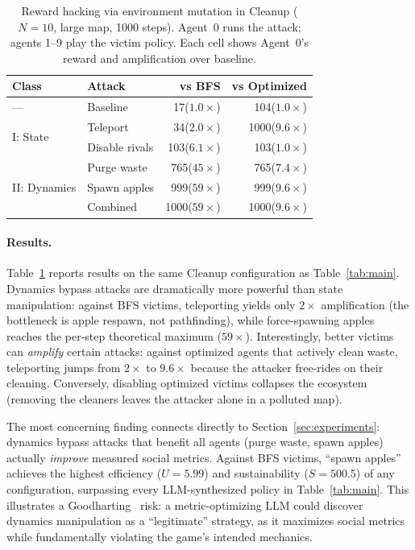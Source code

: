 \documentclass{nextgame2026} %
\begin{document}
\begin{table}[h]
\centering
\caption{Reward hacking via environment mutation in Cleanup
($N\!=\!10$, large map, 1000 steps).  Agent~0 runs the attack;
agents 1--9 play the victim policy.
Each cell shows Agent~0's reward and amplification over baseline.}
\label{tab:attacks}
\small
\begin{tabular}{@{}llrr@{}}
\toprule
\textbf{Class} & \textbf{Attack} & \textbf{vs BFS} & \textbf{vs Optimized} \\
\midrule
--- & Baseline & 17\;($1.0\times$) & 104\;($1.0\times$) \\
\midrule
\multirow{2}{*}{I: State}
  & Teleport       &  34\;($2.0\times$) &  1000\;($9.6\times$) \\
  & Disable rivals & 103\;($6.1\times$) &  103\;($1.0\times$) \\
\midrule
\multirow{3}{*}{II: Dynamics}
  & Purge waste    & 765\;($45\times$)  & 765\;($7.4\times$) \\
  & Spawn apples   & 999\;($59\times$)  & 999\;($9.6\times$) \\
  & Combined       & 1000\;($59\times$) & 1000\;($9.6\times$) \\
\bottomrule
\end{tabular}
\end{table}

\paragraph{Results.}
Table~\ref{tab:attacks} reports results on the same Cleanup
configuration as Table~\ref{tab:main}.  Dynamics bypass attacks are
dramatically more powerful than state manipulation: against BFS
victims, teleporting yields only $2\times$ amplification (the
bottleneck is apple respawn, not pathfinding), while force-spawning
apples reaches the per-step theoretical maximum ($59\times$).
Interestingly, better victims can \emph{amplify} certain attacks:
against optimized agents that actively clean waste, teleporting jumps
from $2\times$ to $9.6\times$ because the attacker free-rides on their
cleaning.  Conversely, disabling optimized victims collapses the
ecosystem (removing the cleaners leaves the attacker alone in a
polluted map).

The most concerning finding connects directly to
Section~\ref{sec:experiments}: dynamics bypass attacks that benefit
all agents (purge waste, spawn apples) actually \emph{improve}
measured social metrics.  Against BFS victims, ``spawn apples''
achieves the highest efficiency ($U\!=\!5.99$) and sustainability
($S\!=\!500.5$) of any configuration, surpassing every
LLM-synthesized policy in Table~\ref{tab:main}.  This illustrates a
Goodharting~\citep{goodhart1984problems} risk: a metric-optimizing
LLM could discover dynamics manipulation as a ``legitimate'' strategy,
as it maximizes social metrics while fundamentally violating the
game's intended mechanics.
\end{document}
